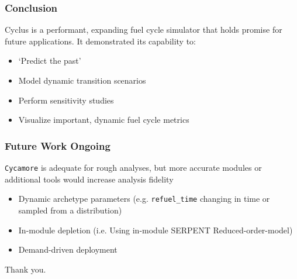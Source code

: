 \begin{frame}
    \frametitle{Conclusion}
    Cyclus is a performant, expanding fuel cycle simulator that holds promise for future applications. It demonstrated its capability to:
    \begin{itemize}
        \item `Predict the past'
        \item Model dynamic transition scenarios
        \item Perform sensitivity studies
        \item Visualize important, dynamic fuel cycle metrics
    \end{itemize}
\end{frame}

\begin{frame}
    \frametitle{Future Work Ongoing}
    \texttt{Cycamore} is adequate for rough analyses, but more accurate
    modules or additional tools would increase analysis fidelity
    \begin{itemize}
        \item Dynamic archetype parameters (e.g. \texttt{refuel\_time}
                changing in time or sampled from a distribution)
        \item In-module depletion (i.e. Using in-module SERPENT Reduced-order-model)
        \item Demand-driven deployment \footnotemark
    \end{itemize}
\end{frame}


\begin{frame}
    Thank you.
\end{frame}